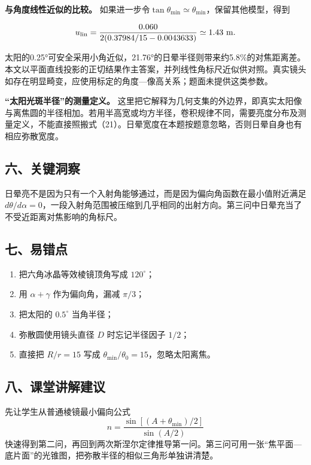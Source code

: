 \documentclass[12pt,a4paper,UTF8]{ctexart}
\newcommand{\tightlist}{\setlength{\itemsep}{0pt}\setlength{\parskip}{0pt}}
\begin{document}
\textbf{与角度线性近似的比较。}
如果进一步令\(\tan\theta_{\min}\simeq\theta_{\min}\)，保留其他模型，得到

\[u_{\rm lin}=\frac{0.060}{2(0.37984/15-0.0043633)}\simeq1.43\ \mathrm m.\]

太阳的0.25°可安全采用小角近似，21.76°的日晕半径则带来约5.8\%的对焦距离差。本文以平面直线投影的正切结果作主答案，并列线性角标尺近似供对照。真实镜头如存在明显畸变，应使用标定的角度---像高关系；题面未提供这类参数。

\textbf{``太阳光斑半径''的测量定义。}
这里把它解释为几何支集的外边界，即真实太阳像与离焦圆的半径相加。若用半高宽或均方半径，卷积规律不同，需要亮度分布及测量定义，不能直接照搬式（21）。日晕宽度在本题按题意忽略，否则日晕自身也有相应弥散宽度。

\subsection{六、关键洞察}\label{ux516dux5173ux952eux6d1eux5bdf-3}

日晕亮不是因为只有一个入射角能够通过，而是因为偏向角函数在最小值附近满足
\(d\theta/d\alpha=0\)，一段入射角范围被压缩到几乎相同的出射方向。第三问中日晕充当了不受近距离对焦影响的角标尺。

\subsection{七、易错点}\label{ux4e03ux6613ux9519ux70b9-3}

\begin{enumerate}
\def\labelenumi{\arabic{enumi}.}
\tightlist
\item
  把六角冰晶等效棱镜顶角写成 \(120^\circ\)；
\item
  用 \(\alpha+\gamma\) 作为偏向角，漏减 \(\pi/3\)；
\item
  把太阳的 \(0.5^\circ\) 当角半径；
\item
  弥散圆使用镜头直径 \(D\) 时忘记半径因子 \(1/2\)；
\item
  直接把 \(R/r=15\) 写成 \(\theta_{\min}/\theta_0=15\)，忽略太阳离焦。
\end{enumerate}

\subsection{八、课堂讲解建议}\label{ux516bux8bfeux5802ux8bb2ux89e3ux5efaux8bae-3}

先让学生从普通棱镜最小偏向公式 \[
n=\frac{\sin[(A+\theta_{\min})/2]}{\sin(A/2)}
\]
快速得到第二问，再回到两次斯涅尔定律推导第一问。第三问可用一张``焦平面---底片面''的光锥图，把弥散半径的相似三角形单独讲清楚。
\end{document}
